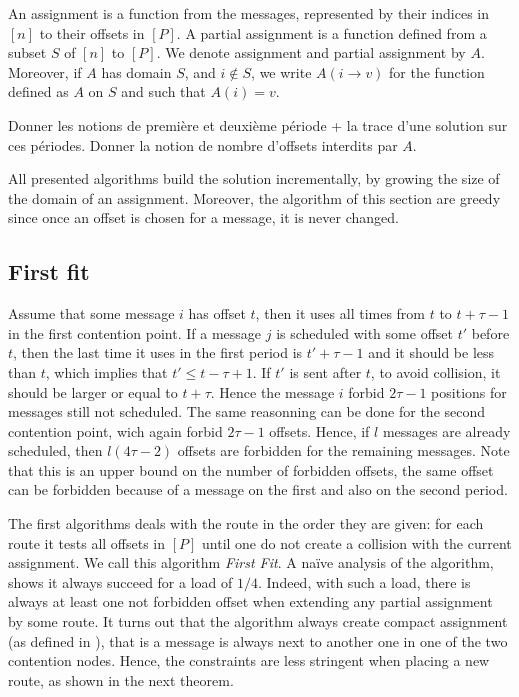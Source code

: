 \documentclass[10pt, conference, letterpaper]{IEEEtran}
\begin{document}
An assignment is a function from the messages, represented by their indices in $[n]$
to their offsets in $[P]$.  
A partial assignment is a function defined from a subset $S$ of $[n]$ to $[P]$.
We denote assignment and partial assignment by $A$. Moreover, if $A$ has domain 
$S$, and $i \notin S$, we write $A(i \rightarrow v)$ for the function defined as 
$A$ on $S$ and such that $A(i) = v$.

Donner les notions de première et deuxième période + la trace 
d'une solution sur ces périodes.
Donner la notion de nombre d'offsets interdits par $A$.


All presented algorithms build the solution incrementally, by growing the size of the domain
of an assignment. Moreover, the algorithm of this section are greedy since once 
an offset is chosen for a message, it is never changed.

\subsection{First fit}

Assume that some message $i$ has offset $t$, then it uses all times from $t$ to $t + \tau -1$ in the first contention point. If a message $j$ is scheduled with some offset $t'$ before $t$, then the last time it uses in the first period is $t'+\tau-1$ and it should be less than $t$, which implies that $t' \leq t- \tau + 1$. If $t'$ is sent after $t$, to avoid collision, it should be larger or equal to $t+ \tau$. Hence the message $i$ forbid $2\tau -1$ positions 
for messages still not scheduled. The same reasonning can be done for the second contention point, wich again forbid $2\tau -1$ offsets. Hence, if $l$ messages are already scheduled,
then $l(4\tau -2)$ offsets are forbidden for the remaining messages. Note that this is an
upper bound on the number of forbidden offsets, the same offset can be forbidden because
of a message on the first and also on the second period.


The first algorithms deals with the route in the order they are given:  for each route it 
tests all offsets in $[P]$ until one do not create a collision with the current assignment.
We call this algorithm \emph{First Fit}. A naïve analysis of the algorithm, 
shows it always succeed for a load of $1/4$. Indeed, with such a load, there is always 
at least one not forbidden offset when extending any partial assignment by some route.
It turns out that the algorithm always
create compact assignment (as defined in \cite{barth2018deterministic}), that is a message is always next to another one in one of the two contention nodes. Hence, the constraints are less stringent when placing a new route, as shown in the next theorem.
\end{document}
